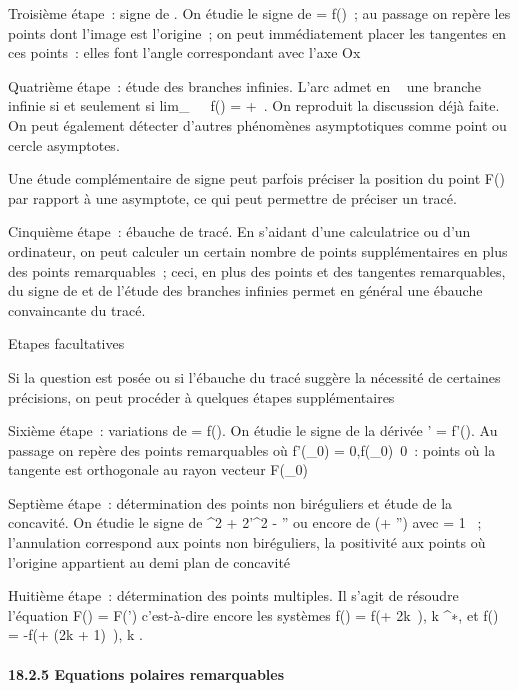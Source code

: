 \documentclass[]{article}
\begin{document}
Troisième étape~: signe de \rho. On étudie le signe de \rho = f(\theta)~; au
passage on repère les points dont l'image est l'origine~; on peut
immédiatement placer les tangentes en ces points~: elles font l'angle
correspondant avec l'axe Ox

Quatrième étape~: étude des branches infinies. L'arc admet en \alpha~
\in\overlineD une branche infinie si et seulement si
lim_\theta\rightarrow~\alpha~~f(\theta) = +\infty~.
On reproduit la discussion déjà faite. On peut également détecter
d'autres phénomènes asymptotiques comme point ou cercle asymptotes.

Une étude complémentaire de signe peut parfois préciser la position du
point F(\theta) par rapport à une asymptote, ce qui peut permettre de
préciser un tracé.

Cinquième étape~: ébauche de tracé. En s'aidant d'une calculatrice ou
d'un ordinateur, on peut calculer un certain nombre de points
supplémentaires en plus des points remarquables~; ceci, en plus des
points et des tangentes remarquables, du signe de \rho et de l'étude des
branches infinies permet en général une ébauche convaincante du tracé.

Etapes facultatives

Si la question est posée ou si l'ébauche du tracé suggère la nécessité
de certaines précisions, on peut procéder à quelques étapes
supplémentaires

Sixième étape~: variations de \rho = f(\theta). On étudie le signe de la dérivée
\rho' = f'(\theta). Au passage on repère des points remarquables où
f'(\theta_0) = 0,f(\theta_0)\neq~0~:
points où la tangente est orthogonale au rayon vecteur F(\theta_0)

Septième étape~: détermination des points non biréguliers et étude de la
concavité. On étudie le signe de \rho^2 + 2\rho'^2 -
\rho\rho'' ou encore de \phi(\phi + \phi'') avec \phi = 1 \over \rho ~;
l'annulation correspond aux points non biréguliers, la positivité aux
points où l'origine appartient au demi plan de concavité

Huitième étape~: détermination des points multiples. Il s'agit de
résoudre l'équation F(\theta) = F(\theta') c'est-à-dire encore les systèmes f(\theta) =
f(\theta + 2k\pi~), k \in {}^∗, et f(\theta) = -f(\theta + (2k + 1)\pi~), k \in {}.

\paragraph{18.2.5 Equations polaires remarquables}
\end{document}

